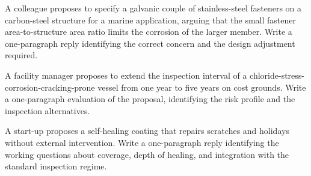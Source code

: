 \begin{exercise}
A colleague proposes to specify a galvanic couple of stainless-steel
fasteners on a carbon-steel structure for a marine application,
arguing that the small fastener area-to-structure area ratio limits
the corrosion of the larger member. Write a one-paragraph reply
identifying the correct concern and the design adjustment required.
\end{exercise}

\begin{exercise}
A facility manager proposes to extend the inspection interval of a
chloride-stress-corrosion-cracking-prone vessel from one year to five
years on cost grounds. Write a one-paragraph evaluation of the
proposal, identifying the risk profile and the inspection alternatives.
\end{exercise}

\begin{exercise}
A start-up proposes a self-healing coating that repairs scratches and
holidays without external intervention. Write a one-paragraph reply
identifying the working questions about coverage, depth of healing,
and integration with the standard inspection regime.
\end{exercise}

